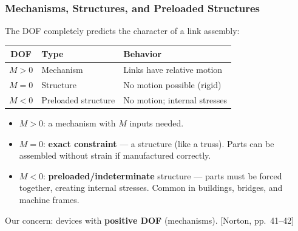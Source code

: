 \documentclass[10pt,aspectratio=43]{beamer}
\newcommand{\pref}[1]{\vfill\hfill{\scriptsize\color{gray}[Norton, pp.~#1]}}
\begin{document}

\begin{frame}
\frametitle{Mechanisms, Structures, and Preloaded Structures}

The DOF completely predicts the character of a link assembly:

\begin{center}
\begin{tabular}{c|l|l}
\toprule
\textbf{DOF} & \textbf{Type} & \textbf{Behavior} \\
\midrule
$M > 0$ & Mechanism & Links have relative motion \\
$M = 0$ & Structure & No motion possible (rigid) \\
$M < 0$ & Preloaded structure & No motion; internal stresses \\
\bottomrule
\end{tabular}
\end{center}

\vspace{6pt}
\begin{itemize}
  \item $M > 0$: a mechanism with $M$ inputs needed.
  \item $M = 0$: \textbf{exact constraint} --- a structure (like a truss). Parts can be assembled without strain if manufactured correctly.
  \item $M < 0$: \textbf{preloaded/indeterminate} structure --- parts must be forced together, creating internal stresses. Common in buildings, bridges, and machine frames.
\end{itemize}

\vspace{4pt}
Our concern: devices with \textbf{positive DOF} (mechanisms).
\pref{41--42}
\end{frame}

\end{document}
